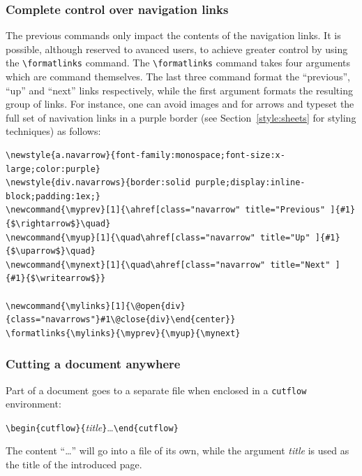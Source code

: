 \subsubsection{Complete control over navigation links}
%
The previous commands only impact the contents of the navigation links.
It is possible, although reserved to avanced users,  to achieve greater control
by using the \verb+\formatlinks+ command. The \verb+\formatlinks+ command
takes four arguments which are command themselves. The last three command
format the ``previous'', ``up'' and ``next'' links respectively,
while the first argument formats the resulting group of links.
For instance, one can avoid images and for arrows and typeset the full set of navivation links in a purple border
(see Section~\ref{style:sheets} for styling techniques) as follows:
\begin{verbatim}
\newstyle{a.navarrow}{font-family:monospace;font-size:x-large;color:purple}
\newstyle{div.navarrows}{border:solid purple;display:inline-block;padding:1ex;}
\newcommand{\myprev}[1]{\ahref[class="navarrow" title="Previous" ]{#1}{$\rightarrow$}\quad}
\newcommand{\myup}[1]{\quad\ahref[class="navarrow" title="Up" ]{#1}{$\uparrow$}\quad}
\newcommand{\mynext}[1]{\quad\ahref[class="navarrow" title="Next" ]{#1}{$\writearrow$}}

\newcommand{\mylinks}[1]{\@open{div}{class="navarrows"}#1\@close{div}\end{center}}
\formatlinks{\mylinks}{\myprev}{\myup}{\mynext}
\end{verbatim}

\subsubsection{Cutting a document anywhere}
Part of a document goes to a separate file when enclosed in a
\verb+cutflow+ environment:
\begin{flushleft}
  \verb+\begin{cutflow}{+\textit{title}\verb+}+\ldots\verb+\end{cutflow}+
\end{flushleft}

\noindent The content ``\ldots'' will go into a file of its
own, while
the argument \textit{title} is used as the title of the introduced
\html{} page.

